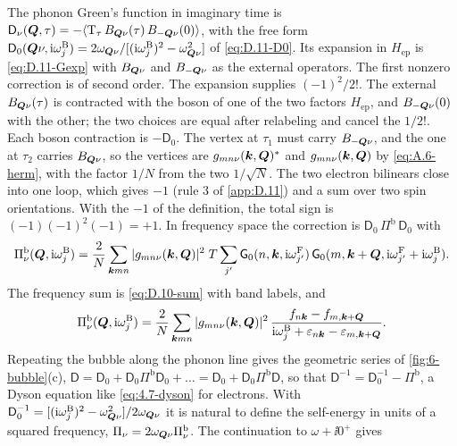 The phonon Green's function in imaginary time is $\mathsf{D}_\nu(\bm{Q},\tau) = -\langle\mathrm{T}_\tau\,B_{\bm{Q}\nu}(\tau)\,B_{-\bm{Q}\nu}(0)\rangle$, with the free form $\mathsf{D}_0(\bm{Q}\nu,\mathrm{i}\omega^{\mathrm{B}}_j) = 2\omega_{\bm{Q}\nu}/[(\mathrm{i}\omega^{\mathrm{B}}_j)^2 - \omega_{\bm{Q}\nu}^2]$ of \cref{eq:D.11-D0}. Its expansion in $H_{\mathrm{ep}}$ is \cref{eq:D.11-Gexp} with $B_{\bm{Q}\nu}$ and $B_{-\bm{Q}\nu}$ as the external operators. The first nonzero correction is of second order. The expansion supplies $(-1)^2/2!$. The external $B_{\bm{Q}\nu}(\tau)$ is contracted with the boson of one of the two factors $H_{\mathrm{ep}}$, and $B_{-\bm{Q}\nu}(0)$ with the other; the two choices are equal after relabeling and cancel the $1/2!$. Each boson contraction is $-\mathsf{D}_0$. The vertex at $\tau_1$ must carry $B_{-\bm{Q}\nu}$, and the one at $\tau_2$ carries $B_{\bm{Q}\nu}$, so the vertices are $g_{mn\nu}(\bm{k},\bm{Q})^*$ and $g_{mn\nu}(\bm{k},\bm{Q})$ by \cref{eq:A.6-herm}, with the factor $1/N$ from the two $1/\sqrt N$. The two electron bilinears close into one loop, which gives $-1$ (rule 3 of \cref{app:D.11}) and a sum over two spin orientations. With the $-1$ of the definition, the total sign is $(-1)(-1)^2(-1) = +1$. In frequency space the correction is $\mathsf{D}_0\,\Pi^{\mathrm{b}}\,\mathsf{D}_0$ with
\begin{equation*}
  \Pi^{\mathrm{b}}_\nu(\bm{Q},\mathrm{i}\omega^{\mathrm{B}}_j) = \frac2N\sum_{\bm{k}mn}|g_{mn\nu}(\bm{k},\bm{Q})|^2\;T\sum_{j'}\mathsf{G}_0(n,\bm{k},\mathrm{i}\omega^{\mathrm{F}}_{j'})\,\mathsf{G}_0(m,\bm{k}+\bm{Q},\mathrm{i}\omega^{\mathrm{F}}_{j'} + \mathrm{i}\omega^{\mathrm{B}}_j) .
\end{equation*}
The frequency sum is \cref{eq:D.10-sum} with band labels, and
\begin{equation*}
  \Pi^{\mathrm{b}}_\nu(\bm{Q},\mathrm{i}\omega^{\mathrm{B}}_j) = \frac2N\sum_{\bm{k}mn}|g_{mn\nu}(\bm{k},\bm{Q})|^2\,\frac{f_{n\bm{k}} - f_{m,\bm{k}+\bm{Q}}}{\mathrm{i}\omega^{\mathrm{B}}_j + \varepsilon_{n\bm{k}} - \varepsilon_{m,\bm{k}+\bm{Q}}} .
\end{equation*}
Repeating the bubble along the phonon line gives the geometric series of \cref{fig:6-bubble}(c), $\mathsf{D} = \mathsf{D}_0 + \mathsf{D}_0\Pi^{\mathrm{b}}\mathsf{D}_0 + \dots = \mathsf{D}_0 + \mathsf{D}_0\Pi^{\mathrm{b}}\mathsf{D}$, so that $\mathsf{D}^{-1} = \mathsf{D}_0^{-1} - \Pi^{\mathrm{b}}$, a Dyson equation like \cref{eq:4.7-dyson} for electrons. With $\mathsf{D}_0^{-1} = [(\mathrm{i}\omega^{\mathrm{B}}_j)^2 - \omega_{\bm{Q}\nu}^2]/2\omega_{\bm{Q}\nu}$ it is natural to define the self-energy in units of a squared frequency, $\Pi_\nu = 2\omega_{\bm{Q}\nu}\Pi^{\mathrm{b}}_\nu$. The continuation to $\omega + \ii0^+$ gives

